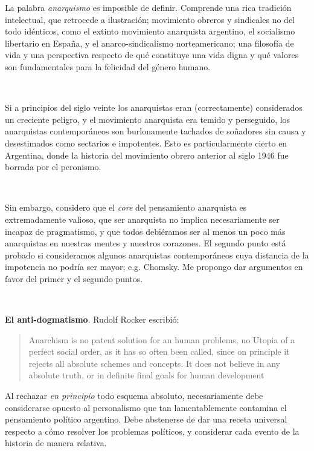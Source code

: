 \documentclass[a4paper, 12pt]{article}
\begin{document}
La palabra \textit{anarquismo} es imposible de definir. Comprende una rica
tradición intelectual, que retrocede a ilustración; movimiento obreros y
sindicales no del todo idénticos, como el extinto movimiento anarquista argentino, el
socialismo libertario en España, y el anarco-sindicalismo norteamericano; una
filosofía de vida y una perspectiva respecto de qué constituye una vida digna y
qué valores son fundamentales para la felicidad del género humano. 

~ 

Si a principios del siglo veinte los anarquistas eran (correctamente) considerados
un creciente peligro, y el movimiento anarquista era temido y perseguido, los
anarquistas contemporáneos son burlonamente tachados de soñadores sin causa
y desestimados como sectarios e impotentes. Esto es particularmente cierto en
Argentina, donde la historia del movimiento obrero anterior al siglo 1946 fue
borrada por el peronismo. 

~

Sin embargo, considero que el \textit{core} del pensamiento anarquista es
extremadamente valioso, que ser anarquista no implica necesariamente ser incapaz
de pragmatismo, y que todos debiéramos ser al menos un poco más anarquistas en
nuestras mentes y nuestros corazones. El segundo punto está probado si
consideramos algunos anarquistas contemporáneos cuya distancia de la impotencia
no podría ser mayor; e.g. Chomsky. Me propongo dar argumentos en favor del
primer y el segundo puntos.

~ 

\textbf{El anti-dogmatismo}. Rudolf
Rocker escribió:


\begin{quote}

Anarchism is no patent solution for an human problems,
no Utopia of a perfect social order, as it has so often been
called, since on principle it rejects all absolute schemes
and concepts. It does not believe in any absolute
truth, or in definite final goals for human development

\end{quote}

Al rechazar \textit{en principio} todo esquema absoluto, necesariamente debe
considerarse opuesto al personalismo que tan lamentablemente contamina el
pensamiento político argentino. Debe abstenerse de dar una receta universal
respecto a cómo resolver los problemas políticos, y considerar cada evento de la
historia de manera relativa.
\end{document}
